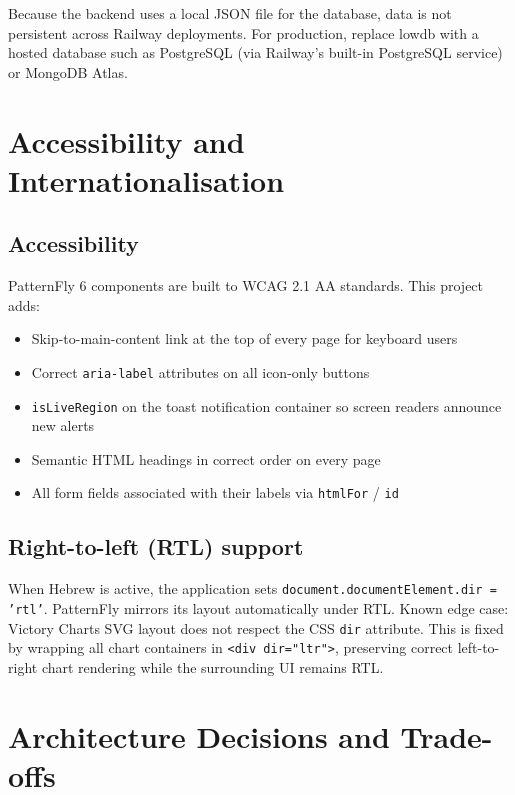 \documentclass[12pt,a4paper]{article}
\begin{document}
\begin{notebox}
Because the backend uses a local JSON file for the database, data is not persistent across Railway deployments. For production, replace lowdb with a hosted database such as PostgreSQL (via Railway's built-in PostgreSQL service) or MongoDB Atlas.
\end{notebox}

\section{Accessibility and Internationalisation}

\subsection{Accessibility}

PatternFly 6 components are built to WCAG 2.1 AA standards. This project adds:

\begin{itemize}
  \item Skip-to-main-content link at the top of every page for keyboard users
  \item Correct \texttt{aria-label} attributes on all icon-only buttons
  \item \texttt{isLiveRegion} on the toast notification container so screen readers announce new alerts
  \item Semantic HTML headings in correct order on every page
  \item All form fields associated with their labels via \texttt{htmlFor} / \texttt{id}
\end{itemize}

\subsection{Right-to-left (RTL) support}

When Hebrew is active, the application sets \texttt{document.documentElement.dir = 'rtl'}. PatternFly mirrors its layout automatically under RTL. Known edge case: Victory Charts SVG layout does not respect the CSS \texttt{dir} attribute. This is fixed by wrapping all chart containers in \texttt{<div dir="ltr">}, preserving correct left-to-right chart rendering while the surrounding UI remains RTL.

\section{Architecture Decisions and Trade-offs}
\label{sec:arch}
\end{document}
